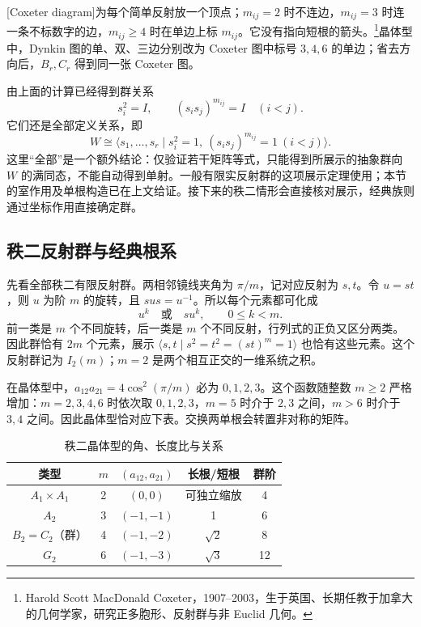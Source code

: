[Coxeter diagram]为每个简单反射放一个顶点；\(m_{ij}=2\) 时不连边，\(m_{ij}=3\) 时连一条不标数字的边，\(m_{ij}\ge4\) 时在单边上标 \(m_{ij}\)。它没有指向短根的箭头。\footnote{Harold Scott MacDonald Coxeter，1907--2003，生于英国、长期任教于加拿大的几何学家，研究正多胞形、反射群与非 Euclid 几何。}晶体型中，Dynkin 图的单、双、三边分别改为 Coxeter 图中标号 \(3,4,6\) 的单边；省去方向后，\(B_r,C_r\) 得到同一张 Coxeter 图。

\ProseParagraphBreak

由上面的计算已经得到群关系
\[
	s_i^2=I,\qquad(s_is_j)^{m_{ij}}=I\quad(i<j).
\]
它们还是全部定义关系，即
\begin{equation}\label{g1:eq:finite-coxeter-presentation}
	W\cong\bigl\langle s_1,\ldots,s_r\mid s_i^2=1,\ (s_is_j)^{m_{ij}}=1\ (i<j)\bigr\rangle.
\end{equation}
这里“全部”是一个额外结论：仅验证若干矩阵等式，只能得到所展示的抽象群向 \(W\) 的满同态，不能自动得到单射。一般有限实反射群的这项展示定理使用\cite[定理6.6.3，第89页；证明见第90--91页及第3.3--3.4节]{Davis2008Coxeter}；本节的室作用及单根构造已在上文给证。接下来的秩二情形会直接核对展示，经典族则通过坐标作用直接确定群。

\subsection{秩二反射群与经典根系}
\label{g1:subsec:E02:04}

先看全部秩二有限反射群。两相邻镜线夹角为 \(\pi/m\)，记对应反射为 \(s,t\)。令 \(u=st\)，则 \(u\) 为阶 \(m\) 的旋转，且 \(sus=u^{-1}\)。所以每个元素都可化成
\[
	u^k\quad\text{或}\quad su^k,\qquad0\le k<m.
\]
前一类是 \(m\) 个不同旋转，后一类是 \(m\) 个不同反射，行列式的正负又区分两类。因此群恰有 \(2m\) 个元素，展示 \(\langle s,t\mid s^2=t^2=(st)^m=1\rangle\) 也恰有这些元素。这个反射群记为 \(I_2(m)\)；\(m=2\) 是两个相互正交的一维系统之积。

\ProseParagraphBreak

在晶体型中，\(a_{12}a_{21}=4\cos^2(\pi/m)\) 必为 \(0,1,2,3\)。这个函数随整数 \(m\ge2\) 严格增加：\(m=2,3,4,6\) 时依次取 \(0,1,2,3\)，\(m=5\) 时介于 \(2,3\) 之间，\(m>6\) 时介于 \(3,4\) 之间。因此晶体型恰对应下表。交换两单根会转置非对称的矩阵。
\begin{table}[htbp]
	\centering
	\caption{秩二晶体型的角、长度比与关系}
	\label{g1:tab:rank-two-root-systems}
	\begin{tabular}{ccccc}
		\toprule
		类型&\(m\)&\((a_{12},a_{21})\)&长根/短根&群阶\\
		\midrule
		\(A_1\times A_1\)&2&\((0,0)\)&可独立缩放&4\\
		\(A_2\)&3&\((-1,-1)\)&1&6\\
		\(B_2=C_2\)（群）&4&\((-1,-2)\)&\(\sqrt2\)&8\\
		\(G_2\)&6&\((-1,-3)\)&\(\sqrt3\)&12\\
		\bottomrule
	\end{tabular}
\end{table}

